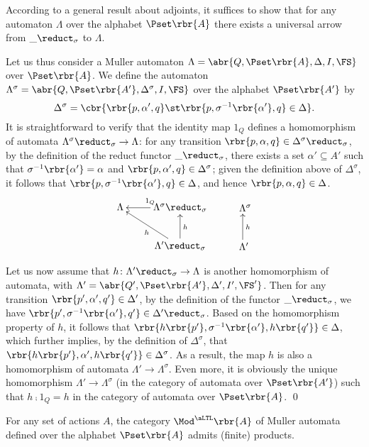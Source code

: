 \documentclass{LMCS}
\begin{document}
\proof
According to a general result about adjoints, it suffices to show that for any automaton \(\Lambda\) over the alphabet \(\Pset\rbr{A}\) there exists a universal arrow from \(\_ \reduct_{\sigma}\) to \(\Lambda\).

Let us thus consider a Muller automaton \(\Lambda = \abr{Q, \Pset\rbr{A}, \Delta, I, \FS}\) over \(\Pset\rbr{A}\).
We define the automaton \(\Lambda^{\sigma} = \abr{Q, \Pset\rbr{A'}, \Delta^{\sigma}, I, \FS}\) over the alphabet \(\Pset\rbr{A'}\) by
\[
\Delta^{\sigma} = \cbr{\rbr{p, \alpha', q} \st \rbr{p, \sigma^{-1}\rbr{\alpha'}, q} \in \Delta}.
\]
It is straightforward to verify that the identity map \(1_{Q}\) defines a homomorphism of automata \(\Lambda^{\sigma} \reduct_{\sigma} \to \Lambda\): for any transition \(\rbr{p, \alpha, q} \in \Delta^{\sigma} \reduct_{\sigma}\), by the definition of the reduct functor \(\_ \reduct_{\sigma}\), there exists a set \(\alpha' \subseteq A'\) such that \(\sigma^{-1}\rbr{\alpha'} = \alpha\) and \(\rbr{p, \alpha', q} \in \Delta^{\sigma}\); given the definition above of \(\Delta^{\sigma}\), it follows that \(\rbr{p, \sigma^{-1}\rbr{\alpha'}, q} \in \Delta\), and hence \(\rbr{p, \alpha, q} \in \Delta\).
\[
\xymatrix {
  {\Lambda}
  & {\Lambda^{\sigma} \reduct_{\sigma}}
  \ar [l] _{1_{Q}}
  & *+[r]{\Lambda^{\sigma}}
  \\
  & {\Lambda' \reduct_{\sigma}}
  \ar [u] _{h}
  \ar [ul] ^{h}
  & *+[r]{\Lambda'}
  \ar [u] _{h}
}
\]

Let us now assume that \(h \colon \Lambda' \reduct_{\sigma} \to \Lambda\) is another homomorphism of automata, with \(\Lambda' = \abr{Q', \Pset\rbr{A'}, \Delta', I', \FS'}\).
Then for any transition \(\rbr{p', \alpha', q'} \in \Delta'\), by the definition of the functor \(\_ \reduct_{\sigma}\), we have \(\rbr{p', \sigma^{-1}\rbr{\alpha'}, q'} \in \Delta' \reduct_{\sigma}\).
Based on the homomorphism property of \(h\), it follows that \(\rbr{h\rbr{p'}, \sigma^{-1}\rbr{\alpha'}, h\rbr{q'}} \in \Delta\), which further implies, by the definition of \(\Delta^{\sigma}\), that \(\rbr{h\rbr{p'}, \alpha', h\rbr{q'}} \in \Delta^{\sigma}\).
As a result, the map \(h\) is also a homomorphism of automata \(\Lambda' \to \Lambda^{\sigma}\).
Even more, it is obviously the unique homomorphism \(\Lambda' \to \Lambda^{\sigma}\) (in the category of automata over \(\Pset\rbr{A'}\)) such that \(h \comp 1_{Q} = h\) in the category of automata over \(\Pset\rbr{A}\).
\qed

\begin{prop}
  \label{proposition:products-of-models-in-aLTL}
  For any set of actions \(A\), the category \(\Mod^{\aLTL}\rbr{A}\) of Muller automata defined over the alphabet \(\Pset\rbr{A}\) admits (finite) products.
\end{prop}
\end{document}
